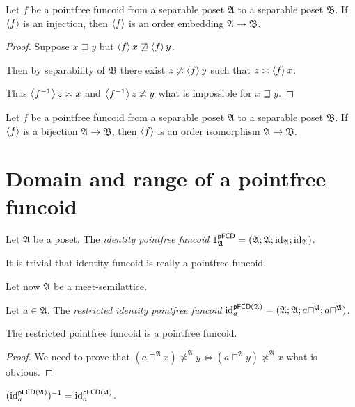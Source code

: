 \begin{thm}
Let $f$ be a pointfree funcoid from a separable poset $\mathfrak{A}$
to a separable poset $\mathfrak{B}$. If $\left\langle f\right\rangle$ is an injection,
then $\left\langle f\right\rangle$ is an order embedding $\mathfrak{A}\rightarrow\mathfrak{B}$.\end{thm}
\begin{proof}
Suppose $x\sqsupseteq y$ but $\left\langle f\right\rangle x\not\sqsupseteq\left\langle f\right\rangle y$.

Then by separability of $\mathfrak{B}$ there exist $z\not\asymp\left\langle f\right\rangle y$
such that $z\asymp\left\langle f\right\rangle x$.

Thus $\left\langle f^{-1}\right\rangle z\asymp x$ and $\left\langle f^{-1}\right\rangle z\not\asymp y$
what is impossible for $x\sqsupseteq y$.\end{proof}
\begin{cor}
Let $f$ be a pointfree funcoid from a separable poset $\mathfrak{A}$
to a separable poset $\mathfrak{B}$. If $\left\langle f\right\rangle$ is a bijection
$\mathfrak{A}\rightarrow\mathfrak{B}$, then $\left\langle f\right\rangle$ is an order
isomorphism $\mathfrak{A}\rightarrow\mathfrak{B}$.
\end{cor}

\section{Domain and range of a pointfree funcoid}
\begin{defn}
Let $\mathfrak{A}$ be a poset.
The \emph{identity pointfree funcoid} $1_{\mathfrak{A}}^{\mathsf{pFCD}}=(\mathfrak{A};\mathfrak{A};\operatorname{id}_{\mathfrak{A}};\operatorname{id}_{\mathfrak{A}})$.
\end{defn}
It is trivial that identity funcoid is really a pointfree funcoid.

Let now $\mathfrak{A}$ be a meet-semilattice.
\begin{defn}
Let $a\in\mathfrak{A}$.
The \emph{restricted identity pointfree funcoid} $\operatorname{id}_{a}^{\mathsf{pFCD}(\mathfrak{A})}=(\mathfrak{A};\mathfrak{A};a\sqcap^{\mathfrak{A}};a\sqcap^{\mathfrak{A}})$.\end{defn}
\begin{prop}
The restricted pointfree funcoid is a pointfree funcoid.\end{prop}
\begin{proof}
We need to prove that $(a\sqcap^{\mathfrak{A}}x)\nasymp^{\mathfrak{A}}y\Leftrightarrow(a\sqcap^{\mathfrak{A}}y)\nasymp^{\mathfrak{A}}x$
what is obvious.\end{proof}
\begin{obvious}
$(\operatorname{id}_{a}^{\mathsf{pFCD}(\mathfrak{A})})^{-1}=\operatorname{id}_{a}^{\mathsf{pFCD}(\mathfrak{A})}$.
\end{obvious}

